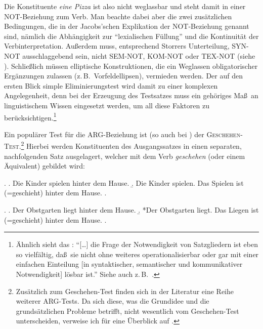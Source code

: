 Die Konstituente {\it eine Pizza} ist also nicht weglassbar und steht damit in einer NOT-Beziehung zum Verb. Man beachte dabei aber die zwei zusätzlichen Bedingungen, die in der Jacobs'schen Explikation der NOT-Beziehung genannt sind, nämlich die Abhängigkeit zur "`lexialischen Füllung"'  und die Kontinuität der Verb\-interpretation. Au\ss erdem muss, entsprechend Storrers Unterteilung, SYN-NOT ausschlaggebend sein, nicht SEM-NOT, KOM-NOT oder TEX-NOT (siehe \citealt[105]{Storrer:92}). Schlie\ss lich müssen elliptische Konstruktionen, die ein Weglassen obligatorischer Ergänzungen zulassen (z.\,B.\ Vorfeldellipsen), vermieden werden. Der auf den ersten Blick simple Eliminierungstest wird damit zu einer komplexen Angelegenheit, denn bei der Erzeugung des Testsatzes muss ein gehöriges Ma\ss \ an linguistischem Wissen eingesetzt werden, um all diese Faktoren zu berücksichtigen.\footnote{Ähnlich sieht das \citet[36f]{Heringer:84}: "`[\ldots] die Frage der Notwendigkeit von Satzgliedern ist eben so vielfältig, da\ss \ sie nicht ohne weiteres operationalisierbar oder gar mit einer einfachen Einteilung [in syntaktischer, semantischer und kommunikativer Notwendigkeit] lösbar ist."' Siehe auch z.\,B.\ \citet[226]{Vater:81}.} %

\largerpage%
Ein populärer Test für die ARG-Beziehung ist (so auch bei \citealt[17f]{Jacobs:94}) der \textsc{Gesche\-hen-Test}.\footnote{Zusätzlich zum Geschehen-Test finden sich in der Literatur eine Reihe weiterer ARG-Tests. Da sich diese, was die Grundidee und die grundsätzlichen Probleme betrifft, nicht wesentlich vom Geschehen-Test unterscheiden, verweise ich für eine Überblick auf \citet[178]{Agel:00}.} Hierbei werden Konstituenten des Ausgangssatzes in einen separaten, nachfolgenden Satz ausgelagert, welcher mit dem Verb {\it geschehen} (oder einem Äquivalent) gebildet wird:

\ex. 
\a. Die Kinder spielen hinter dem Hause.
\b. Die Kinder spielen. Das Spielen ist (=geschieht) hinter dem Hause.
\z. \citep[63]{Storrer:92}

\ex. 
\a. Der Obstgarten liegt hinter dem Hause.
\b. *Der Obstgarten liegt. Das Liegen ist (=geschieht) hinter dem Hause.
\z. \citep[63]{Storrer:92}

